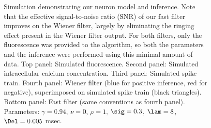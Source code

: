 \newpage \begin{figure}[H]
\caption{Simulation demonstrating our neuron model and inference. Note that the effective signal-to-noise ratio (SNR) of our fast filter improves on the Wiener filter, largely by eliminating the ringing effect present in the Wiener filter output.  For both filters, only the fluorescence was provided to the algorithm, so both the parameters and the inference were performed using this minimal amount of data.  Top panel: Simulated fluorescence. Second panel: Simulated intracellular calcium concentration. Third panel: Simulated spike train.  Fourth panel: Wiener filter (blue for positive inference, red for negative), superimposed on simulated spike train (black triangles).  Bottom panel: Fast filter (same conventions as fourth panel). Parameters:  $\gamma=0.94$, $\nu=0$, $\rho=1$, $\sig=0.3$, $\lam=8$, $\Del=0.005$ msec.} \label{fig:schem2}
\end{figure}

